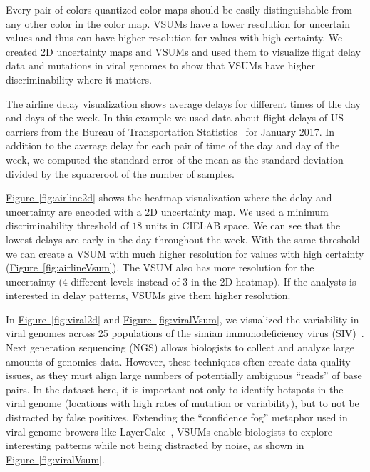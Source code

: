 \documentclass{vgtc}                          %
\newcommand{\figref}[1]{\hyperref[#1]{Figure~\ref*{#1}}}
\begin{document}
Every pair of colors quantized color maps should be easily distinguishable from any other color in the color map. VSUMs have a lower resolution for uncertain values and thus can have higher resolution for values with high certainty. We created 2D uncertainty maps and VSUMs and used them to visualize flight delay data and mutations in viral genomes to show that VSUMs have higher discriminability where it matters.

The airline delay visualization shows average delays for different times of the day and days of the week. In this example we used data about flight delays of US carriers from the Bureau of Transportation Statistics~\cite{bts} for January 2017. In addition to the average delay for each pair of time of the day and day of the week, we computed the standard error of the mean as the standard deviation divided by the squareroot of the number of samples.

\airlineFig

\figref{fig:airline2d} shows the heatmap visualization where the delay and uncertainty are encoded with a 2D uncertainty map. We used a minimum discriminability  threshold of $18$ units in CIELAB space. We can see that the lowest delays are early in the day throughout the week. With the same threshold we can create a VSUM with much higher resolution for values with high certainty (\figref{fig:airlineVsum}). The VSUM also has more resolution for the uncertainty (4 different levels instead of 3 in the 2D heatmap). If the analysts is interested in delay patterns, VSUMs give them higher resolution.

\viralFig

In \figref{fig:viral2d} and \figref{fig:viralVsum}, we visualized the variability in viral genomes across 25 populations of the simian immunodeficiency virus (SIV)~\cite{o2012conditional}. Next generation sequencing (NGS) allows biologists to collect and analyze large amounts of genomics data. However, these techniques often create data quality issues, as they must align large numbers of potentially ambiguous ``reads'' of base pairs. In the dataset here, it is important not only to identify hotspots in the viral genome (locations with high rates of mutation or variability), but to not be distracted by false positives. Extending the ``confidence fog'' metaphor used in viral genome browers like LayerCake~\cite{correll2015layercake}, VSUMs enable biologists to explore interesting patterns while not being distracted by noise, as shown in \figref{fig:viralVsum}.
\end{document}
